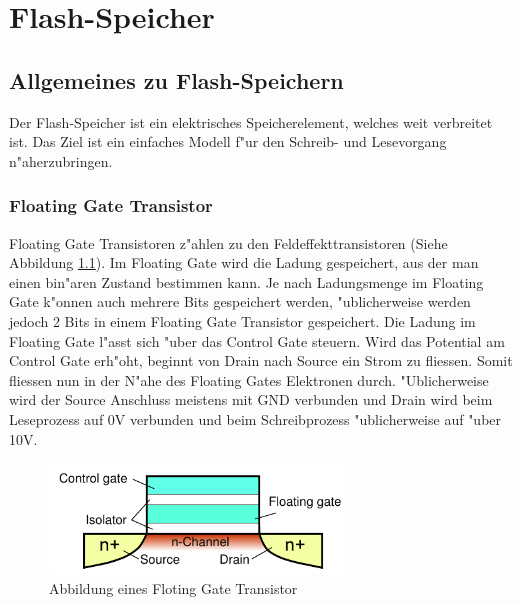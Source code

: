 \chapter{Flash-Speicher\label{chapter:flash}}
\begin{refsection}

\section{Allgemeines zu Flash-Speichern}
Der Flash-Speicher ist ein elektrisches Speicherelement, welches
weit verbreitet ist.
Das Ziel ist ein einfaches Modell f"ur den Schreib- und Lesevorgang
n"aherzubringen.

\subsection{Floating Gate Transistor}
Floating Gate Transistoren z"ahlen zu den Feldeffekttransistoren
(Siehe Abbildung \ref{skript:Floatinggatetransistor}).
%
Im Floating Gate wird die Ladung gespeichert, aus der man einen bin"aren
Zustand bestimmen kann.
Je nach Ladungsmenge im Floating Gate k"onnen auch mehrere Bits gespeichert
werden, "ublicherweise werden jedoch 2 Bits in einem Floating Gate
Transistor gespeichert.
Die Ladung im Floating Gate l"asst sich "uber das Control Gate steuern.
Wird das Potential am Control Gate erh"oht, beginnt von Drain nach
Source ein Strom zu fliessen.
Somit fliessen nun in der N"ahe des Floating Gates Elektronen durch.
"Ublicherweise wird der Source Anschluss meistens mit GND verbunden und
Drain wird beim Leseprozess auf 0V verbunden und beim Schreibprozess
"ublicherweise auf "uber 10V.

\begin{figure}
\centering
\includegraphics[width=0.7\textwidth]{flash/graphics/Floatinggate.pdf}
\caption{Abbildung eines Floting Gate Transistor \cite{flash:floatinggate}}
\label{skript:Floatinggatetransistor}
\end{figure}


\end{refsection}
